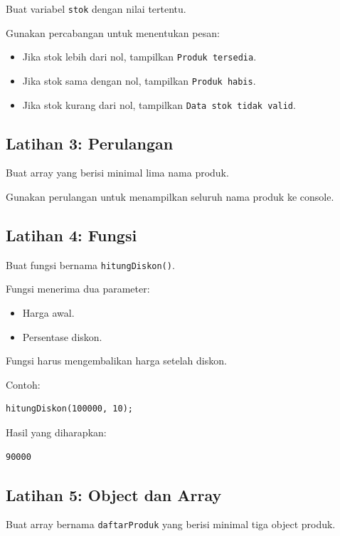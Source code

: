 \documentclass[12pt,a4paper]{article}
\begin{document}
Buat variabel \texttt{stok} dengan nilai tertentu.

Gunakan percabangan untuk menentukan pesan:

\begin{itemize}
    \item Jika stok lebih dari nol, tampilkan
    \texttt{Produk tersedia}.
    \item Jika stok sama dengan nol, tampilkan
    \texttt{Produk habis}.
    \item Jika stok kurang dari nol, tampilkan
    \texttt{Data stok tidak valid}.
\end{itemize}

\subsection{Latihan 3: Perulangan}

Buat array yang berisi minimal lima nama produk.

Gunakan perulangan untuk menampilkan seluruh
nama produk ke console.

\subsection{Latihan 4: Fungsi}

Buat fungsi bernama \texttt{hitungDiskon()}.

Fungsi menerima dua parameter:

\begin{itemize}
    \item Harga awal.
    \item Persentase diskon.
\end{itemize}

Fungsi harus mengembalikan harga setelah diskon.

Contoh:

\begin{lstlisting}
hitungDiskon(100000, 10);
\end{lstlisting}

Hasil yang diharapkan:

\begin{lstlisting}
90000
\end{lstlisting}

\subsection{Latihan 5: Object dan Array}

Buat array bernama \texttt{daftarProduk} yang
berisi minimal tiga object produk.
\end{document}
